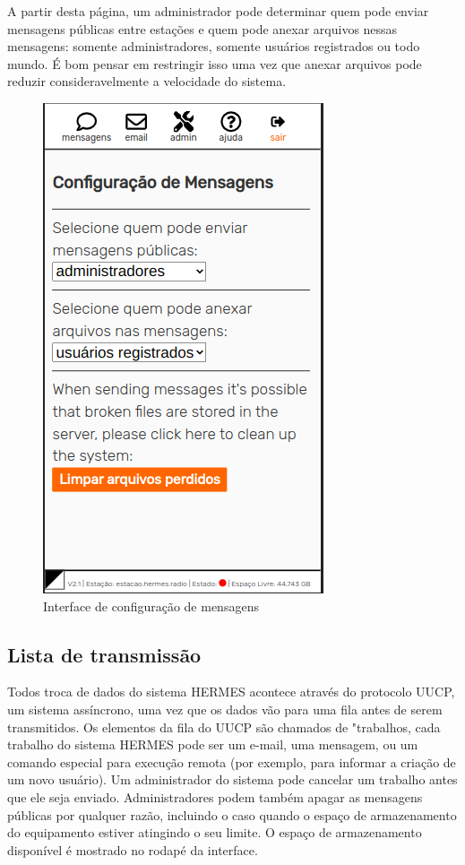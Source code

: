 \documentclass[11pt,a4paper]{article}
\begin{document}
A partir desta página, um administrador pode determinar quem pode enviar mensagens públicas entre estações e quem pode anexar arquivos nessas mensagens: somente administradores, somente usuários registrados ou todo mundo. É bom pensar em restringir isso uma vez que anexar arquivos pode reduzir consideravelmente a velocidade do sistema.


   
    \begin{figure}[H]
    \centering
    \includegraphics[width=0.5\columnwidth]{screenshots/frontend/pt_kn/messageadm.png}
    \caption{Interface de configuração de mensagens}
    \label{fig:messageadm}
   
    \end{figure}


\subsection{Lista de transmissão}
\label{gui_trans_list}

Todos troca de dados do sistema HERMES acontece através do protocolo UUCP, um sistema assíncrono, uma vez que os dados vão para uma fila antes de serem transmitidos. Os elementos da fila do UUCP são chamados de "trabalhos, cada trabalho do sistema HERMES pode ser um e-mail, uma mensagem, ou um comando especial para execução remota (por exemplo, para informar a criação de um novo usuário). Um administrador do sistema pode cancelar um trabalho antes que ele seja enviado. Administradores podem também apagar as mensagens públicas por qualquer razão, incluindo o caso quando o espaço de armazenamento do equipamento estiver atingindo o seu limite. O espaço de armazenamento disponível é mostrado no rodapé da interface. 
\end{document}
